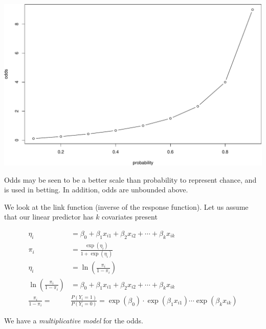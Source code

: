 \documentclass[
  ignorenonframetext,
]{beamer}
\begin{document}
\begin{frame}
\includegraphics{Module03PresentationWeek1_files/figure-beamer/unnamed-chunk-7-1.pdf}

Odds may be seen to be a better scale than probability to represent
chance, and is used in betting. In addition, odds are unbounded above.
\end{frame}

\begin{frame}
We look at the link function (inverse of the response function). Let us
assume that our linear predictor has \(k\) covariates present

\begin{align*}
\eta_i&= \beta_0+\beta_1 x_{i1}+\beta_2 x_{i2}+\cdots + \beta_k x_{ik}\\
\pi_i&= \frac{\exp(\eta_i)}{1+\exp(\eta_i)}\\
\eta_i&=\ln(\frac{\pi_i}{1-\pi_i})\\
\ln(\frac{\pi_i}{1-\pi_i})&=\beta_0+\beta_1 x_{i1}+\beta_2 x_{i2}+\cdots + \beta_k x_{ik}\\
\frac{\pi_i}{1-\pi_i}=&\frac{P(Y_i=1)}{P(Y_i=0)}=\exp(\beta_0)\cdot \exp(\beta_1 x_{i1})\cdots\exp(\beta_k x_{ik})
\end{align*}

We have a \emph{multiplicative model} for the odds.
\end{frame}
\end{document}
